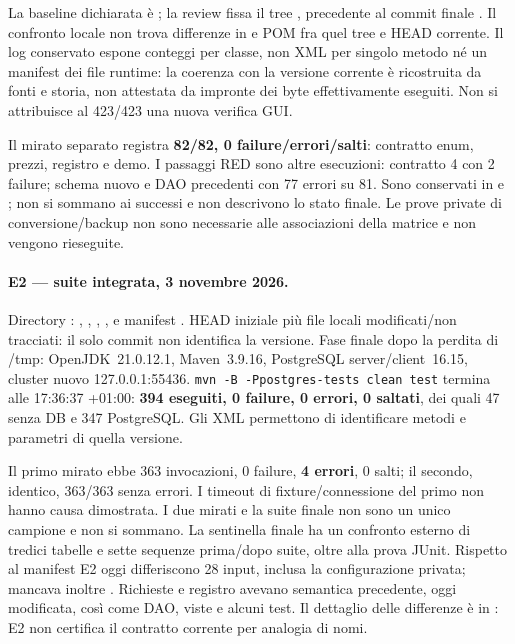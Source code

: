 La baseline dichiarata è ; la review fissa il tree
, precedente al commit
finale . Il confronto locale non trova differenze in
 e POM fra quel tree e HEAD corrente. Il log conservato espone
conteggi per classe, non XML per singolo metodo né un manifest dei file
runtime: la coerenza con la versione corrente è ricostruita da fonti e
storia, non attestata da impronte dei byte effettivamente eseguiti.
Non si attribuisce al 423/423 una nuova verifica GUI.

Il mirato separato registra \textbf{82/82, 0 failure/errori/salti}:
contratto enum, prezzi, registro e demo. I passaggi RED sono altre
esecuzioni: contratto 4 con 2 failure; schema nuovo e DAO precedenti
con 77 errori su 81. Sono conservati in  e
; non si sommano ai successi e non descrivono
lo stato finale. Le prove private di conversione/backup non sono
necessarie alle associazioni della matrice e non vengono rieseguite.

\paragraph{E2 --- suite integrata, 3 novembre 2026.}
Directory :
, , ,
,  e manifest
. HEAD iniziale  più file
locali modificati/non tracciati: il solo commit non identifica la versione.
Fase finale dopo la perdita di /tmp: OpenJDK~21.0.12.1, Maven~3.9.16,
PostgreSQL server/client~16.15, cluster nuovo 127.0.0.1:55436.
\texttt{mvn -B -Ppostgres-tests clean test} termina alle 17:36:37 +01:00:
\textbf{394 eseguiti, 0 failure, 0 errori, 0 saltati}, dei quali 47
senza DB e 347 PostgreSQL. Gli XML permettono di identificare metodi
e parametri di quella versione.

Il primo mirato ebbe 363 invocazioni, 0 failure, \textbf{4 errori},
0 salti; il secondo, identico, 363/363 senza errori. I timeout di
fixture/connessione del primo non hanno causa dimostrata. I due mirati
e la suite finale non sono un unico campione e non si sommano.
La sentinella finale ha un confronto esterno di tredici tabelle e sette
sequenze prima/dopo suite, oltre alla prova JUnit. Rispetto al manifest
E2 oggi differiscono 28 input, inclusa la configurazione privata;
mancava inoltre . Richieste e registro
avevano semantica precedente, oggi modificata, così come DAO, viste e
alcuni test. Il dettaglio delle differenze è in
: E2 non certifica il
contratto corrente per analogia di nomi.

